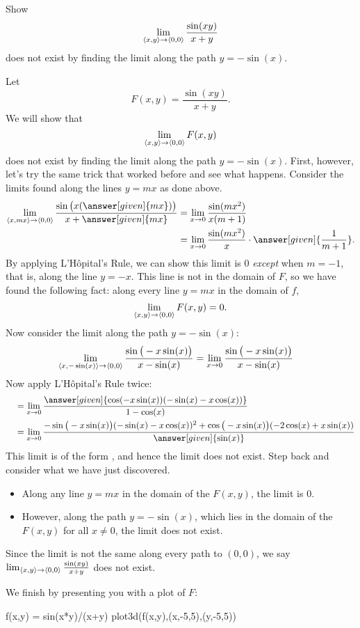 \documentclass{ximera}
\begin{document}
\begin{example}
  Show
  \[
  \lim_{\left\langle x,y\right\rangle\to\left\langle 0,0\right\rangle} \frac{\sin(xy)}{x+y}
  \]
  does not exist by finding the limit along the path $y=-\sin(x)$.
  \begin{explanation}
    Let
    \[
    F(x,y) = \frac{\sin(xy)}{x+y}.
    \]
    We will show that
    \[
    \lim_{\left\langle x,y\right\rangle\to\left\langle 0,0\right\rangle} F(x,y)
    \]
    does not exist by finding the limit along the path
    $y=-\sin(x)$. First, however, let's try the same trick that worked
    before and see what happens. Consider the limits found along the
    lines $y=mx$ as done above.
    \begin{align*}
      \lim_{\vector{x,mx}\to\vector{0,0}} \frac{\sin\big(x(\answer[given]{mx})\big)}{x+\answer[given]{mx}} &= \lim_{x\to 0} \frac{\sin (mx^2)}{x(m+1)} \\
      &= \lim_{x\to 0} \frac{\sin(mx^2)}{x}\cdot\answer[given]{\frac{1}{m+1}}.
    \end{align*}
    By applying L'H\^opital's Rule, we can show this limit is $0$
    \emph{except} when $m=-1$, that is, along the line $y=-x$. This
    line is not in the domain of $F$, so we have found the following
    fact: along every line $y=mx$ in the domain of $f$,
    \[
    \lim_{\left\langle x,y\right\rangle\to\left\langle 0,0\right\rangle} F(x,y)=0.
    \]
    Now consider the limit along the path $y=-\sin(x)$:
    \begin{align*}
      \lim_{\left\langle x,-\sin(x)\right\rangle\to\left\langle 0,0\right\rangle} \frac{\sin\big(-x\sin(x)\big)}{x-\sin(x)} &= \lim_{x\to0} \frac{\sin\big(-x\sin(x)\big)}{x-\sin(x)}
    \end{align*}
    Now apply L'H\^opital's Rule twice:
    \begin{align*}
      \quad &= \lim_{x\to 0}\frac{\answer[given]{\cos(-x\sin(x))(-\sin(x)-x\cos(x))}}{1-\cos(x)} \\
      &= \lim_{x\to 0}\frac{-\sin\big(-x\sin(x)\big)(-\sin(x)-x\cos(x))^2+\cos\big(-x\sin(x)\big)(-2\cos(x)+x\sin(x))}{\answer[given]{\sin(x)}}
    \end{align*}
    This limit is of the form \numOverZero, and hence the limit does
    not exist.  Step back and consider what we have just discovered.
    \begin{itemize}
    \item Along any line $y=mx$ in the domain of the $F(x,y)$, the
      limit is $0$.
    \item However, along the path $y=-\sin(x)$, which lies in the
      domain of the $F(x,y)$ for all $x\neq 0$, the limit does not
      exist.
    \end{itemize}
    Since the limit is not the same along every path to $(0,0)$, we say
    $\lim_{\left\langle x,y\right\rangle\to\left\langle 0,0\right\rangle}\frac{\sin(xy)}{x+y}$ does not exist.
        \begin{onlineOnly}
          We finish by presenting you with a plot of $F$:
\begin{sageCell}
f(x,y) = sin(x*y)/(x+y)
plot3d(f(x,y),(x,-5,5),(y,-5,5))
\end{sageCell}
    \end{onlineOnly}
  \end{explanation}
\end{example}
\end{document}
